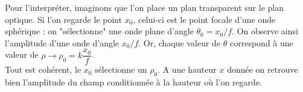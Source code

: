 Pour l'interpréter, imaginons que l'on place un plan transparent sur le plan optique. Si l'on regarde 
le point $x_0$, celui-ci est le point focale d'une onde sphérique : on "sélectionne" une onde plane 
d'angle $\theta_0 = x_0/f$. On observe ainsi l'amplitude d'une onde d'angle $x_0/f$. Or, chaque valeur 
de $\theta$ correspond à une valeur de $\rho \longrightarrow \rho_0 = k\dfrac{x_0}{f}$.\\

Tout est cohérent, le $x_0$ sélectionne un $\rho_0$. A une hauteur $x$ donnée on retrouve bien 
l'amplitude du champ conditionnée à la hauteur où l'on regarde. 






















